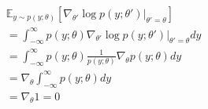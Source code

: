 \begin{answer}
\begin{align*}
    &\mathbb{E}_{y\sim p(y;\theta)}[\nabla_{\theta'} \log p(y;\theta')|_{\theta'=\theta}]\\
    &= \int_{-\infty}^{\infty}p(y; \theta)\nabla_{\theta'} \log p(y;\theta')|_{\theta'=\theta}dy\\
    &= \int_{-\infty}^{\infty}p(y; \theta) \frac{1}{p(y;\theta)}\nabla_{\theta}p(y; \theta) dy\\
    &= \nabla_\theta \int_{-\infty}^{\infty} p(y; \theta) dy\\
    &= \nabla_\theta 1 = 0
\end{align*}
\end{answer}
